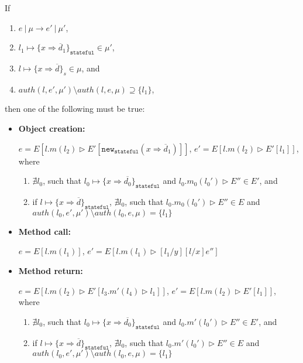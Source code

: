 \documentclass{llncs}
\newcommand{\keywadj}[1]{\mathtt{#1}}
\begin{document}
\newpage

\begin{theorem} If
\begin{enumerate}
\item $e~|~\mu \longrightarrow e'~|~\mu'$,
\item $l_1 \mapsto \{ x \Rightarrow \overline{d}_1 \}_{\keywadj{stateful}} \in \mu'$,
\item $l \mapsto \{ x \Rightarrow \overline{d} \}_s \in \mu$, and
\item $auth(l, e', \mu') \setminus auth(l, e, \mu) \supseteq \{ l_1 \}$,
\end{enumerate}
then one of the following must be true:
\begin{itemize}
\item \textbf{Object creation:}

$e = E[l.m(l_2) \rhd E'[\keywadj{new}_{\keywadj{stateful}}(x \Rightarrow \overline{d}_1)]]$, $e' = E[l.m(l_2) \rhd E'[l_1]]$, where
\begin{enumerate}
\item $\nexists l_0$, such that $l_0 \mapsto \{ x \Rightarrow \overline{d_0}\}_{\keywadj{stateful}}$ and $l_0.m_0(l_0') \rhd E'' \in E'$, and
\item if $l \mapsto \{ x \Rightarrow \overline{d}\}_{\keywadj{stateful}}$, $\nexists l_0$, such that $l_0.m_0(l_0') \rhd E'' \in E$ and $auth(l_0, e', \mu') \setminus auth(l_0, e, \mu) = \{ l_1 \}$
\end{enumerate}

\item \textbf{Method call:}

$e = E[l.m(l_1)]$, $e' = E[l.m(l_1) \rhd [l_1/y][l/x]e'']$

\item \textbf{Method return:}

$e = E[l.m(l_2) \rhd E'[l_3.m'(l_4) \rhd l_1]]$, $e' = E[l.m(l_2) \rhd E'[l_1]]$, where
\begin{enumerate}
\item $\nexists l_0$, such that $l_0 \mapsto \{ x \Rightarrow \overline{d_0}\}_{\keywadj{stateful}}$ and $l_0.m'(l_0') \rhd E'' \in E'$, and
\item if $l \mapsto \{ x \Rightarrow \overline{d}\}_{\keywadj{stateful}}$, $\nexists l_0$, such that $l_0.m'(l_0') \rhd E'' \in E$ and $auth(l_0, e', \mu') \setminus auth(l_0, e, \mu) = \{ l_1 \}$
\end{enumerate}
\end{itemize}

\end{theorem}
\end{document}

